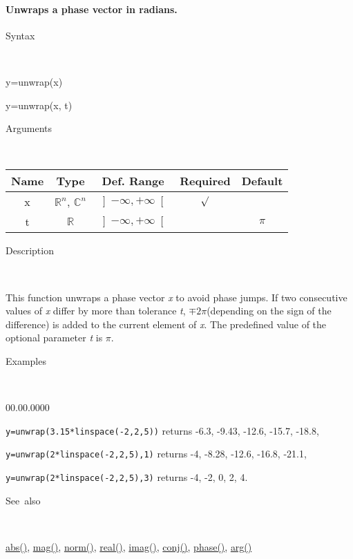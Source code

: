 \paragraph{\label{par:Unwrap}Unwraps a phase vector in radians.}

\begin{description}
\item [Syntax]~
\end{description}
y=unwrap(x)

y=unwrap(x, t)

\begin{description}
\item [Arguments]~
\end{description}
\begin{tabular}{|c|c|c|c|c|}
\hline 
Name&
Type&
Def. Range&
Required&
Default\tabularnewline
\hline
\hline 
x&
$\mathbb{R}^{n}$, $\mathbb{C}^{n}$&
$\left]-\infty,+\infty\right[$&
$\surd$&
\tabularnewline
\hline
t&
$\mathbb{R}$&
$\left]-\infty,+\infty\right[$&
&
$\pi$\tabularnewline
\hline
\end{tabular}

\begin{description}
\item [Description]~
\end{description}
This function unwraps a phase vector \textit{x} to avoid phase jumps.
If two consecutive values of \textit{x} differ by more than tolerance
\textit{t}, $\mp2\pi$(depending on the sign of the difference) is
added to the current element of \textit{x}. The predefined value of
the optional parameter \textit{t} is $\pi$.

\begin{description}
\item [Examples]~
\end{description}
\begin{lyxlist}{00.00.0000}
\item [\texttt{y=unwrap(3.15{*}linspace(-2,2,5))}]returns -6.3, -9.43,
-12.6, -15.7, -18.8,
\end{lyxlist}
\texttt{y=unwrap(2{*}linspace(-2,2,5),1)} returns -4, -8.28, -12.6,
-16.8, -21.1,

\texttt{y=unwrap(2{*}linspace(-2,2,5),3)} returns -4, -2,
0, 2, 4.

\begin{description}
\item [See~also]~
\end{description}
\textcolor{blue}{\hyperlink{abs}{abs()}}, \textcolor{blue}{\hyperlink{mag}{mag()}},
\textcolor{blue}{\hyperlink{norm}{norm()}}, \textcolor{blue}{\hyperlink{real}{real()}},
\textcolor{blue}{\hyperlink{imag}{imag()}}, \textcolor{blue}{\hyperlink{conj}{conj()}},
\textcolor{blue}{\hyperlink{phase}{phase()}}, \textcolor{blue}{\hyperlink{arg}{arg()}}


